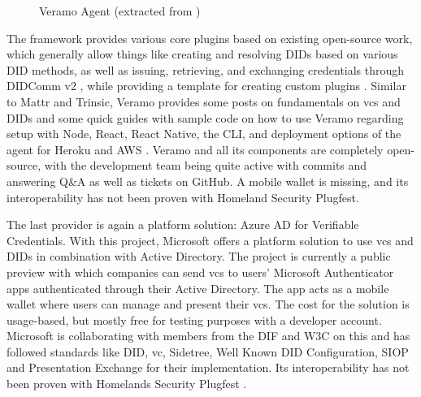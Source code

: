     \begin{figure}[ht]
	    \centering    	    \makebox[\textwidth]{}
        \caption{Veramo Agent (extracted from \cite{veramo_veramo_2021-2})}
        \label{figure: veramo agent}
    \end{figure}
    
    The framework provides various core plugins based on existing open-source work, which generally allow things like creating and resolving \acp{DID} based on various \ac{DID} methods, as well as issuing, retrieving, and exchanging credentials through DIDComm v2 \cite{veramo_veramo_2021-2, veramo_blog_2021}, while providing a template for creating custom plugins \cite{veramo_uport-projectveramo-plugin_2021}. Similar to Mattr and Trinsic, Veramo provides some posts on fundamentals on \acp{vc} and \acp{DID} and some quick guides with sample code on how to use Veramo regarding setup with Node, React, React Native, the \ac{CLI}, and deployment options of the agent for Heroku and AWS \cite{veramo_veramo_2021-2}. Veramo and all its components are completely open-source, with the development team being quite active with commits and answering Q\&A as well as tickets on GitHub. A mobile wallet is missing, and its interoperability has not been proven \cite{homeland_security_interoperability_2021} with Homeland Security Plugfest.
    
    The last provider is again a platform solution: Azure AD for Verifiable Credentials. With this project, Microsoft offers a platform solution to use \acp{vc} and \acp{DID} in combination with Active Directory. The project is currently a public preview with which companies can send \acp{vc} to users' Microsoft Authenticator apps authenticated through their Active Directory. The app acts as a mobile wallet where users can manage and present their \acp{vc}. The cost for the solution is usage-based, but mostly free for testing purposes with a developer account. Microsoft is collaborating with members from the DIF and W3C on this and has followed standards like \ac{DID}, \ac{vc}, Sidetree, Well Known DID Configuration, SIOP and Presentation Exchange for their implementation. Its interoperability has not been proven with Homelands Security Plugfest \cite{homeland_security_interoperability_2021}. \cite{neira_introduction_2021, simons_announcing_2021, microsoft_identitatsnachweis-losungen_2021}
    
